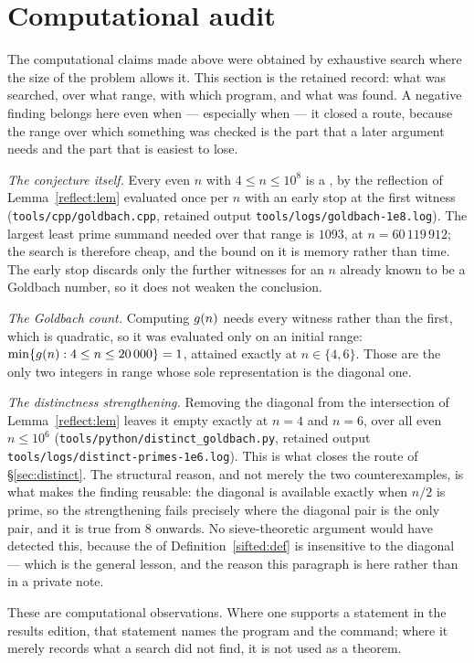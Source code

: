 \section{Computational audit}\label{sec:computations}

The computational claims made above were obtained by exhaustive search where
the size of the problem allows it.  This section is the retained record: what
was searched, over what range, with which program, and what was found.  A
negative finding belongs here even when --- especially when --- it closed a
route, because the range over which something was checked is the part that a
later argument needs and the part that is easiest to lose.

\emph{The conjecture itself.}  Every even $n$ with $4\leq n\leq10^{8}$ is a
, by the reflection of Lemma~\ref{reflect:lem} evaluated
once per $n$ with an early stop at the first witness
(\texttt{tools/cpp/goldbach.cpp}, retained output
\texttt{tools/logs/goldbach-1e8.log}).  The largest least prime summand needed
over that range is $1093$, at $n=60\,119\,912$; the search is therefore cheap,
and the bound on it is memory rather than time.  The early stop discards only
the further witnesses for an $n$ already known to be a Goldbach number, so it
does not weaken the conclusion.

\emph{The Goldbach count.}  Computing $g(n)$ needs every witness rather than
the first, which is quadratic, so it was evaluated only on an initial range:
$\min\{g(n):4\leq n\leq20\,000\}=1$, attained exactly at $n\in\{4,6\}$.  Those
are the only two integers in range whose sole representation is the diagonal
one.

\emph{The distinctness strengthening.}  Removing the diagonal from the
intersection of Lemma~\ref{reflect:lem} leaves it empty exactly at $n=4$ and
$n=6$, over all even $n\leq10^{6}$
(\texttt{tools/python/distinct\_goldbach.py}, retained output
\texttt{tools/logs/distinct-primes-1e6.log}).  This is what closes the route of
\S\ref{sec:distinct}.  The structural reason, and not merely the two
counterexamples, is what makes the finding reusable: the diagonal is available
exactly when $n/2$ is prime, so the strengthening fails precisely where the
diagonal pair is the only pair, and it is true from $8$ onwards.  No
sieve-theoretic argument would have detected this, because the
 of Definition~\ref{sifted:def} is insensitive to the
diagonal --- which is the general lesson, and the reason this paragraph is
here rather than in a private note.

These are computational observations.  Where one supports a statement in the
results edition, that statement names the program and the command; where it
merely records what a search did not find, it is not used as a theorem.
